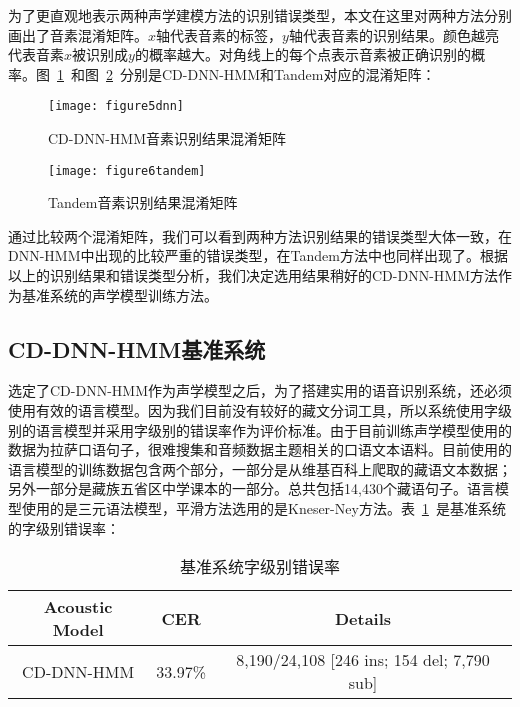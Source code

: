 为了更直观地表示两种声学建模方法的识别错误类型，本文在这里对两种方法分别画出了音素混淆矩阵。$x$轴代表音素的标签，$y$轴代表音素的识别结果。颜色越亮代表音素$x$被识别成$y$的概率越大。对角线上的每个点表示音素被正确识别的概率。图~\ref{fig:figure5}~和图~\ref{fig:figure6}~分别是CD-DNN-HMM和Tandem对应的混淆矩阵：
\begin{figure}[htbp]
\centering
\texttt{[image: figure5dnn]}
\caption{CD-DNN-HMM音素识别结果混淆矩阵}\label{fig:figure5}
\vspace{\baselineskip}
\end{figure}

\begin{figure}[htbp]
\centering
\texttt{[image: figure6tandem]}
\caption{Tandem音素识别结果混淆矩阵}\label{fig:figure6}
\vspace{\baselineskip}
\end{figure}

通过比较两个混淆矩阵，我们可以看到两种方法识别结果的错误类型大体一致，在DNN-HMM中出现的比较严重的错误类型，在Tandem方法中也同样出现了。根据以上的识别结果和错误类型分析，我们决定选用结果稍好的CD-DNN-HMM方法作为基准系统的声学模型训练方法。
\subsection{CD-DNN-HMM基准系统}
选定了CD-DNN-HMM作为声学模型之后，为了搭建实用的语音识别系统，还必须使用有效的语言模型。因为我们目前没有较好的藏文分词工具，所以系统使用字级别的语言模型并采用字级别的错误率作为评价标准。由于目前训练声学模型使用的数据为拉萨口语句子，很难搜集和音频数据主题相关的口语文本语料。目前使用的语言模型的训练数据包含两个部分，一部分是从维基百科上爬取的藏语文本数据；另外一部分是藏族五省区中学课本的一部分。总共包括14,430个藏语句子。语言模型使用的是三元语法模型，平滑方法选用的是Kneser-Ney方法。表~\ref{tab:table3}~是基准系统的字级别错误率：
\begin{table}[htbp]
\caption{基准系统字级别错误率}\label{tab:table3}
\vspace{0.5em}\centering\wuhao
\begin{tabular}{ccc}
\toprule[1.5pt]
Acoustic Model & CER & Details \\
\midrule[1pt]
 CD-DNN-HMM & 33.97\% & 8,190/24,108 [246 ins; 154 del; 7,790 sub] \\
\bottomrule[1.5pt]
\end{tabular}
\vspace{\baselineskip}
\end{table}

